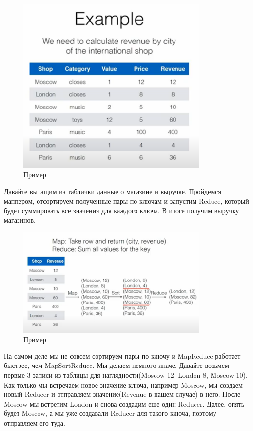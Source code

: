 \documentclass{article}
\begin{document}
\begin{figure}[h]
\centering
\includegraphics[width=0.85\textwidth, trim={0 0 0 5cm}, clip]{MapReduce_example.png}
\caption{Пример}
\end{figure}

Давайте вытащим из таблички данные о магазине и выручке. Пройдемся маппером, отсортируем полученные пары по ключам и запустим Reduce, который будет суммировать все значения для каждого ключа. В итоге получим выручку магазинов.

\begin{figure}[h]
\centering
\includegraphics[width=0.85\textwidth]{MapReduce_example2.png}
\caption{Пример}
\end{figure}

На самом деле мы не совсем сортируем пары по ключу и MapReduce работает быстрее, чем MapSortReduce. Мы делаем немного иначе. Давайте возьмем первые 3 записи из таблицы для наглядности(Moscow 12, London 8, Moscow 10). Как только мы встречаем новое значение ключа, например Moscow, мы создаем новый Reducer и отправляем значение(Revenue в нашем случае) в него. После Moscow мы встретим London и снова создадим еще один Reducer. Далее, опять будет Moscow, а мы уже создавали Reducer для такого ключа, поэтому отправляем его туда.\\
\end{document}
